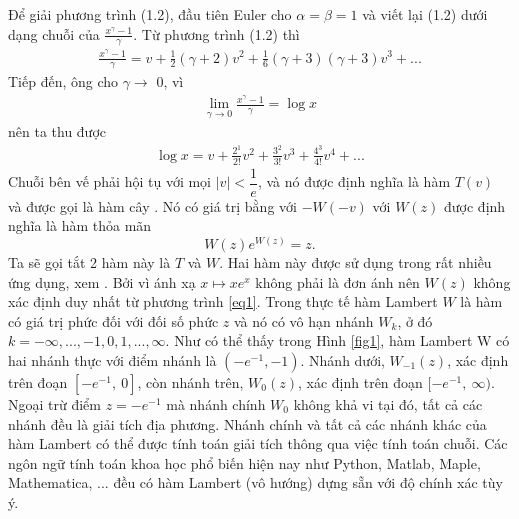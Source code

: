 Để giải phương trình (1.2), đầu tiên Euler cho $\alpha = \beta = 1$ và viết lại (1.2) dưới dạng chuỗi của $\frac{x^{\gamma}-1}{\gamma}$. Từ phương trình (1.2) thì 
\begin{align*}
\frac{x^{\gamma}-1}{\gamma} = v + \frac{1}{2}(\gamma+2)v^{2} + \frac{1}{6}(\gamma+3)(\gamma+3)v^{3} + ... 
\end{align*}
Tiếp đến, ông cho $\gamma \rightarrow$ 0, vì 
%
\begin{align*} 
\displaystyle \lim_{\gamma \to 0}\frac{x^{\gamma}-1}{\gamma} = \log x 
\end{align*}
%
nên ta thu được
%
\begin{align} 
\log x = v + \frac{2^{1}}{2!}v^{2} + \frac{3^{2}}{3!}v^{3} + \frac{4^3}{4!}v^{4} + ... 
\end{align}
Chuỗi bên vế phải hội tụ với mọi $|v| < \dfrac{1}{e}$, và nó được định nghĩa là hàm $T(v)$ và được gọi là hàm cây \cite{Cor96}. Nó có giá trị bằng với $-W(-v)$ với $W(z)$ được định nghĩa là hàm thỏa mãn 
%
\begin{equation}\label{eq1}
W(z)e^{W(z)} = z.
\end{equation} 
%
Ta sẽ gọi tắt 2 hàm này là $T$ và $W$. Hai hàm này được sử dụng trong rất nhiều ứng dụng, xem \cite{Cor96}. 
%
Bởi vì ánh xạ $x \mapsto xe^x$ không phải là đơn ánh nên $W(z)$ không xác định duy nhất từ phương trình \eqref{eq1}. 
Trong thực tế hàm Lambert $W$ là hàm có giá trị phức đối với đối số phức $z$ và nó có vô hạn nhánh $W_{k}$, ở đó $k = -\infty, ..., -1, 0 , 1, ..., \infty$. 
Như có thể thấy trong Hình \ref{fig1}, hàm Lambert W có hai nhánh thực với điểm nhánh là $(-e^{-1},-1)$. 
Nhánh dưới, $W_{-1}(z)$, xác định trên đoạn $[-e^{-1}, \ 0]$, còn nhánh trên, $W_{0}(z)$, xác định trên đoạn $[-e^{-1}, \ \infty)$.
Ngoại trừ điểm $z=-e^{-1}$ mà nhánh chính $W_0$ không khả vi tại đó, tất cả các nhánh đều là giải tích địa phương. Nhánh chính và tất cả các nhánh khác của hàm Lambert có thể được tính toán giải tích thông qua việc tính toán chuỗi. Các ngôn ngữ tính toán khoa học phổ biến hiện nay như Python, Matlab, Maple, Mathematica, ... đều có hàm Lambert (vô hướng) dựng sẵn với độ chính xác tùy ý.

